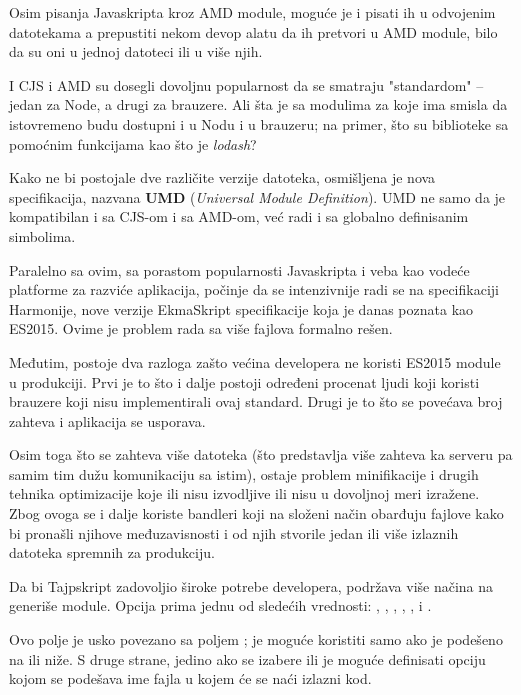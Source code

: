 Osim pisanja Javaskripta kroz AMD module, moguće je i pisati ih u odvojenim datotekama a prepustiti nekom devop alatu da ih pretvori u AMD module, bilo da su oni u jednoj datoteci ili u više njih.

I CJS i AMD su dosegli dovoljnu popularnost da se smatraju "standardom" -- jedan za Node, a drugi za brauzere.
Ali šta je sa modulima za koje ima smisla da istovremeno budu dostupni i u Nodu i u brauzeru; na primer, što su biblioteke sa pomoćnim funkcijama kao što je \textsl{lodash}?

Kako ne bi postojale dve različite verzije datoteka, osmišljena je nova specifikacija, nazvana \textbf{UMD} (\textsl{Universal Module Definition}).
UMD ne samo da je kompatibilan i sa CJS-om i sa AMD-om, već radi i sa globalno definisanim simbolima.

Paralelno sa ovim, sa porastom popularnosti Javaskripta i veba kao vodeće platforme za razviće aplikacija, počinje da se intenzivnije radi se na specifikaciji Harmonije, nove verzije EkmaSkript specifikacije koja je danas poznata kao ES2015.
Ovime je problem rada sa više fajlova formalno rešen.

Međutim, postoje dva razloga zašto većina developera ne koristi ES2015 module u produkciji.
Prvi je to što i dalje postoji određeni procenat ljudi koji koristi brauzere koji nisu implementirali ovaj standard.
Drugi je to što se povećava broj zahteva i aplikacija se usporava.

Osim toga što se zahteva više datoteka (što predstavlja više zahteva ka serveru pa samim tim dužu komunikaciju sa istim), ostaje problem minifikacije i drugih tehnika optimizacije koje ili nisu izvodljive ili nisu u dovoljnoj meri izražene.
Zbog ovoga se i dalje koriste bandleri koji na složeni način obarđuju fajlove kako bi pronašli njihove međuzavisnosti i od njih stvorile jedan ili više izlaznih datoteka spremnih za produkciju.

Da bi Tajpskript zadovoljio široke potrebe developera, podržava više načina na generiše module.
Opcija  prima jednu od sledećih vrednosti: , , , , , i .

Ovo polje je usko povezano sa poljem ;  je moguće koristiti samo ako je  podešeno na  ili niže.
S druge strane, jedino ako se izabere  ili  je moguće definisati opciju  kojom se podešava ime fajla u kojem će se naći izlazni kod.

